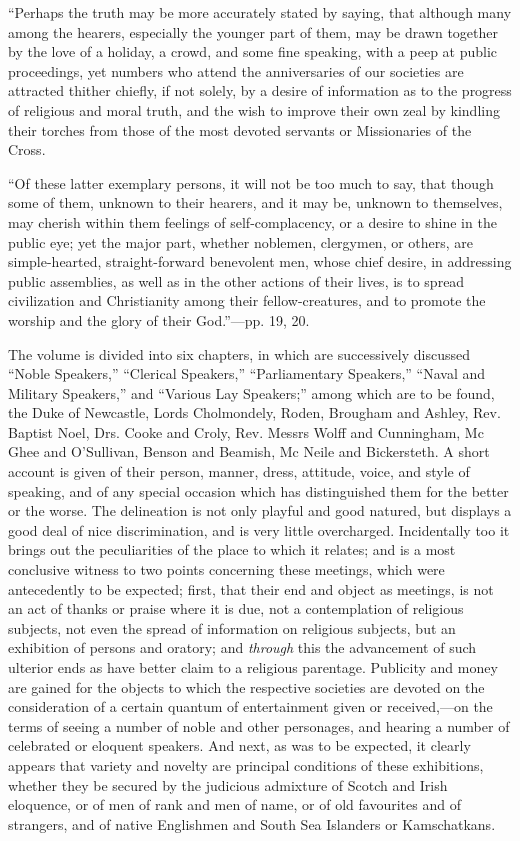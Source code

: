 ``Perhaps
the truth may be more accurately stated by saying, that although many
among the hearers, especially the younger part of them, may be drawn
together by the love of a holiday, a crowd, and some fine speaking, with
a peep at public proceedings, yet numbers who attend the anniversaries
of our societies are attracted thither chiefly, if not solely, by a
desire of information as to the progress of religious and moral truth,
and the wish to improve their own zeal by kindling their torches from
those of the most devoted servants or Missionaries of the Cross.

``Of
these latter exemplary persons, it will not be too much to say, that
though some of them, unknown to their hearers, and it may be, unknown to
themselves, may cherish within them feelings of self-complacency, or a
desire to shine in the public eye; yet the major part, whether noblemen,
clergymen, or others, are simple-hearted, straight-forward benevolent
men, whose chief desire, in addressing public assemblies, as well as in
the other actions of their lives, is to spread civilization and
Christianity among their fellow-creatures, and to promote the worship
and the glory of their God.''—pp. 19, 20.

The volume
is divided into six chapters, in which are successively discussed ``Noble Speakers,''
``Clerical Speakers,'' ``Parliamentary
Speakers,'' ``Naval and Military Speakers,'' and ``Various Lay
Speakers;'' among which are to be found, the Duke of Newcastle, Lords
Cholmondely, Roden, Brougham and Ashley, Rev. Baptist Noel, Drs. Cooke
and Croly, Rev. Messrs Wolff and Cunningham, Mc Ghee and O'Sullivan,
Benson and Beamish, Mc Neile and Bickersteth. A short account is given
of their person, manner, dress, attitude, voice, and style of speaking,
and of any special occasion which has distinguished them for the better
or the worse. The delineation is not only playful and good natured, but
displays a good deal of nice discrimination, and is very little
overcharged. Incidentally too it brings out the peculiarities of the
place to which it relates; and is a most conclusive witness to two
points concerning these meetings, which were antecedently to be
expected; first, that their end and object as meetings, is not an act of
thanks or praise where it is due, not a contemplation of religious
subjects, not even the spread of information on religious subjects, but
an exhibition of persons and oratory; and \emph{through} this the
advancement of such ulterior ends as have better claim to a religious
parentage. Publicity and money are gained for the objects to which the
respective societies are devoted on the consideration of a certain
quantum of entertainment given or received,—on the terms of seeing a
number of noble and other personages, and hearing a number of celebrated
or eloquent speakers. And
next, as was to be expected, it clearly appears that variety and novelty
are principal conditions of these exhibitions, whether they be secured
by the judicious admixture of Scotch and Irish eloquence, or of men of
rank and men of name, or of old favourites and of strangers, and of
native Englishmen and South Sea Islanders or Kamschatkans.

